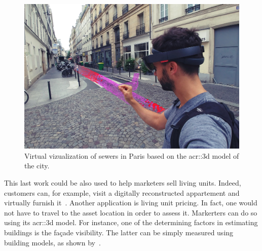             \begin{figure}[htpb]
                \centering
                \includegraphics[width=\textwidth]{images/3d_model_applications/insitu_sewer_hololens}            
                \caption{
                    \label{fig::augemented_reality} Virtual vizualization of sewers in Paris based on the \gls{acr::3d} model of the city.
                }
            \end{figure}
            This last work could be also used to help marketers sell living units.
            Indeed, customers can, for example, visit a digitally reconstructed appartement and virtually furnish it~\parencite{kim2019planar}.
            Another application is living unit pricing.
            In fact, one would not have to travel to the asset location in order to assess it.
            Markerters can do so using its \gls{acr::3d} model.
            For instance, one of the determining factors in estimating buildings is the fa\c{c}ade visibility.
            The latter can be simply measured using building models, as shown by~\textcite{albrecht2013assessing}.

